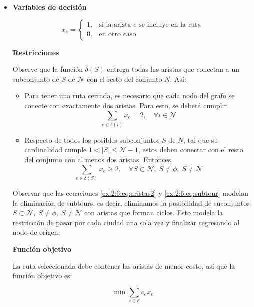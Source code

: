 \begin{itemize}
\item[(a)]
\textbf{Variables de decisión}

\begin{equation}
x_e =
\begin{cases}
1, & \text{si la arista } e \text{ se incluye en la ruta} \\
0, & \text{en otro caso}
\end{cases}
\end{equation}

\textbf{Restricciones}

Observe que la función $\delta(S)$ entrega todas las aristas que conectan a un subconjunto
de $S$ de $\mathcal{N}$ con el resto del conjunto $N$. Así:

\begin{itemize}
    \item Para tener una ruta cerrada, es necesario que cada nodo del grafo se conecte con
    exactamente dos aristas. Para esto, se deberá cumplir
    \begin{equation}
    \sum_{e \in \delta(i)} x_e = 2, \quad \forall i \in \mathcal{N}
    \label{ex:2:6:eq:aristas2}
    \end{equation}

    \item Respecto de todos los posibles subconjuntos $S$ de $N$, tal que su cardinalidad cumple $1 < |S| \leq \mathcal{N}-1$, estos deben conectar con el resto del conjunto con al menos dos aristas. Entonces,
    \begin{equation}
    \sum_{e \in \delta(S)} x_e \geq 2, \quad \forall S \subset \mathcal{N},\; S \neq \phi,\; S \neq \mathcal{N}
    \label{ex:2:6:eq:subtour}
    \end{equation}
\end{itemize}

Observar que las ecuaciones \eqref{ex:2:6:eq:aristas2} y \eqref{ex:2:6:eq:subtour} modelan la eliminación de subtours, es decir, eliminamos la posibilidad de suconjuntos $S \subset \mathcal{N},\; S \neq \phi,\; S \neq \mathcal{N}$ con aristas que forman ciclos. Esto modela la restricción de pasar por cada ciudad una sola vez y finalizar regresando al nodo de origen.

\textbf{Función objetivo}

La ruta seleccionada debe contener las aristas de menor costo, así que la función objetivo es:

\begin{equation}
\min \sum_{e \in \mathcal{E}} c_e x_e
\end{equation}


\end{itemize}
